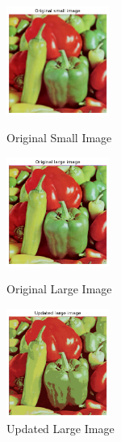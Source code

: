 \begin{answer}
    \begin{figure}[H]
        \centering
        \includegraphics[width=0.3\textwidth]{../src/k_means/orig_small.png}
        \caption{Original Small Image}
        \label{fig:k_means_orig_small}

        \includegraphics[width=0.3\textwidth]{../src/k_means/orig_large.png}
        \caption{Original Large Image}
        \label{fig:k_means_orig_large}

        \includegraphics[width=0.3\textwidth]{../src/k_means/updated_large.png}
        \caption{Updated Large Image}
        \label{fig:k_means_updated_large}
    \end{figure}
\end{answer}
